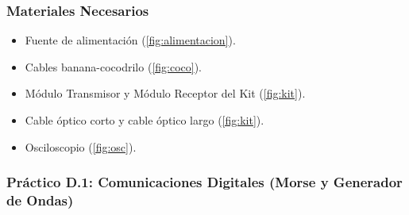 \subsubsection{Materiales Necesarios}
\begin{itemize}
    \item Fuente de alimentación (\autoref{fig:alimentacion}).
    \item Cables banana-cocodrilo (\autoref{fig:coco}).
    \item Módulo Transmisor y Módulo Receptor del Kit (\autoref{fig:kit}).
    \item Cable óptico corto y cable óptico largo (\autoref{fig:kit}).
    \item Osciloscopio (\autoref{fig:osc}).
\end{itemize}

\subsubsection{Práctico D.1: Comunicaciones Digitales (Morse y Generador de Ondas)}

